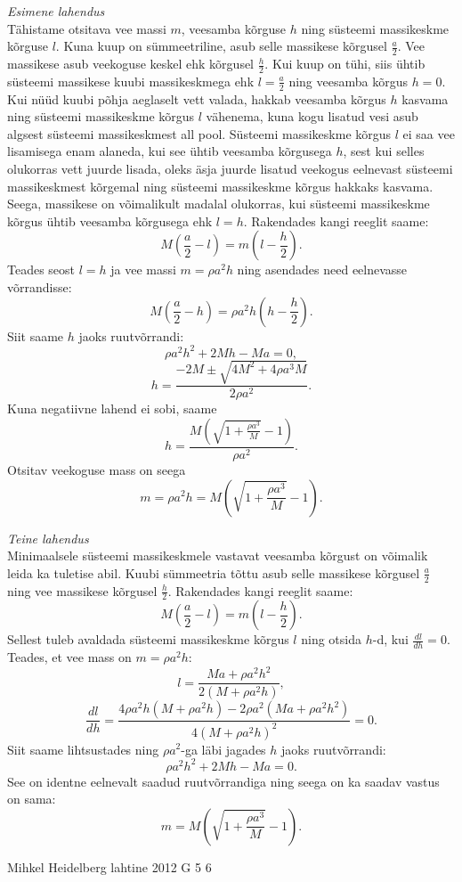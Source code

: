 \documentclass[11pt]{article}
\begin{document}
{{\ifSolution
\emph{Esimene lahendus}\\
Tähistame otsitava vee massi $m$, veesamba kõrguse $h$ ning süsteemi massikeskme kõrguse $l$. Kuna kuup on sümmeetriline, asub selle massikese kõrgusel $\frac{a}{2}$. Vee massikese asub veekoguse keskel ehk kõrgusel $\frac{h}{2}$. Kui kuup on tühi, siis ühtib süsteemi massikese kuubi massikeskmega ehk $l=\frac{a}{2}$ ning veesamba kõrgus $h=0$. Kui nüüd kuubi põhja aeglaselt vett valada, hakkab veesamba kõrgus $h$ kasvama ning süsteemi massikeskme kõrgus $l$ vähenema, kuna kogu lisatud vesi asub algsest süsteemi massikeskmest all pool. Süsteemi massikeskme kõrgus $l$ ei saa vee lisamisega enam alaneda, kui see ühtib veesamba kõrgusega $h$, sest kui selles olukorras vett juurde lisada, oleks äsja juurde lisatud veekogus eelnevast süsteemi massikeskmest kõrgemal ning süsteemi massikeskme kõrgus hakkaks kasvama. Seega, massikese on võimalikult madalal olukorras, kui süsteemi massikeskme kõrgus ühtib veesamba kõrgusega ehk $l=h$.
Rakendades kangi reeglit saame:
$$M(\frac{a}{2}-l)=m(l-\frac{h}{2}).$$ 
Teades seost $l=h$ ja vee massi $m=\rho a^2h$ ning asendades need eelnevasse võrrandisse:
$$M(\frac{a}{2}-h)=\rho a^2h(h-\frac{h}{2}).$$ 
Siit saame $h$ jaoks ruutvõrrandi:
$$\rho a^2h^2+2Mh-Ma=0,$$
$$h=\frac{-2M \pm \sqrt{4M^2+4\rho a^3M}}{2\rho a^2}.$$
Kuna negatiivne lahend ei sobi, saame
$$h=\frac{M(\sqrt{1+\frac{\rho a^3}{M}}-1)}{\rho a^2}.$$
Otsitav veekoguse mass on seega
$$m=\rho a^2h=M(\sqrt{1+\frac{\rho a^3}{M}}-1).$$

\emph{Teine lahendus}\\
Minimaalsele süsteemi massikeskmele vastavat veesamba kõrgust on võimalik leida ka tuletise abil. Kuubi sümmeetria tõttu asub selle massikese kõrgusel $\frac{a}{2}$ ning vee massikese kõrgusel $\frac{h}{2}$. Rakendades kangi reeglit saame: 
$$M(\frac{a}{2}-l)=m(l-\frac{h}{2}).$$ 
Sellest tuleb avaldada süsteemi massikeskme kõrgus $l$ ning otsida $h$-d, kui $\frac{dl}{dh}=0$. Teades, et vee mass on $m=\rho a^2h$:
$$l=\frac{Ma+\rho a^2h^2}{2(M+\rho a^2h)},$$ 
$$\frac{dl}{dh}=\frac{4\rho a^2h(M+\rho a^2h)-2\rho a^2(Ma+\rho a^2h^2)}{4(M+\rho a^2h)^2}=0.$$ 
Siit saame lihtsustades ning $\rho a^2$-ga läbi jagades $h$ jaoks ruutvõrrandi:
$$\rho a^2h^2+2Mh-Ma=0.$$ 
See on identne eelnevalt saadud ruutvõrrandiga ning seega on ka saadav vastus on sama:
$$m=M(\sqrt{1+\frac{\rho a^3}{M}}-1).$$
\fi
}

{Mihkel Heidelberg} %
{lahtine} %
{2012} %
{G 5} %
{6} %
{

}}
\end{document}
